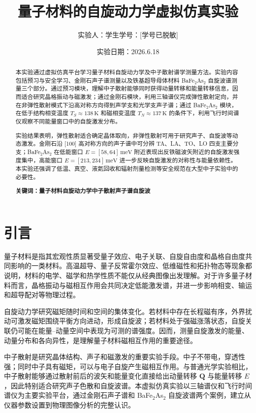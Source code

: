 \documentclass[a4paper]{ctexart}
\title{量子材料的自旋动力学虚拟仿真实验}
\author{实验人：学生\qquad 学号：[学号已脱敏]}
\date{实验日期：2026.6.18}
\begin{document}
\maketitle

\begin{abstract}
本实验通过虚拟仿真平台学习量子材料自旋动力学及中子散射谱学测量方法。实验内容包括预习与安全学习、金刚石声子谱测量以及铁基超导母体材料 BaFe$_2$As$_2$ 自旋波谱测量三个部分。通过预习模块，理解中子散射能够同时获得动量转移和能量转移信息，因而适合研究晶格振动与磁激发；通过金刚石模块，利用三轴谱仪完成弹性散射定向，并在非弹性散射模式下沿高对称方向得到声学支和光学支声子谱；通过 BaFe$_2$As$_2$ 模块，在低于结构相变温度 $T_S\approx138\,\mathrm{K}$ 和磁相变温度 $T_N\approx137\,\mathrm{K}$ 的条件下，利用飞行时间谱仪观察不同能量窗口中的自旋激发分布。

实验结果表明，弹性散射适合确定晶体取向，非弹性散射可用于研究声子、自旋波等动态激发。金刚石沿 [100] 高对称方向的声子谱中可分辨 TA、LA、TO、LO 四支主要分支；BaFe$_2$As$_2$ 在低能窗口 $E=[58,64]\,\mathrm{meV}$ 附近表现出反铁磁波矢附近的自旋激发强度集中，高能窗口 $E=[213,234]\,\mathrm{meV}$ 进一步反映自旋激发的对称性与能量依赖性。本实验还强调了低温、真空、液氦回收和辐射剂量检测等安全规范在大型中子实验中的必要性。

\textbf{关键词：量子材料\quad 自旋动力学\quad 中子散射\quad 声子谱\quad 自旋波}
\end{abstract}

\section{引言}

量子材料是指其宏观性质显著受量子效应、电子关联、自旋自由度和晶格自由度共同影响的一类材料。高温超导、量子反常霍尔效应、低维磁性和拓扑物态等现象都说明，材料的电学、磁学和热学性质不能仅从经典图像出发理解。对于许多量子材料而言，晶格振动与磁相互作用会共同决定低能激发谱，并进一步影响相变、输运和超导配对等物理过程。

自旋动力学研究磁矩随时间和空间的集体变化。若材料中存在长程磁有序，外界扰动可激发磁矩围绕平衡方向进动，形成自旋波；若材料处于强磁涨落状态，自旋关联仍可能在能量--动量空间中表现为可测的谱强度。因而，测量自旋激发的能量、动量分布和各向异性，是理解量子材料磁相互作用的重要途径。

中子散射是研究晶体结构、声子和磁激发的重要实验手段。中子不带电，穿透性强；同时中子具有磁矩，可以与电子自旋产生磁相互作用。与普通光学实验相比，中子散射能够通过散射前后的波矢和能量变化直接给出动量转移 $\mathbf{Q}$ 与能量转移 $E$，因此特别适合研究声子色散和自旋波谱。本虚拟仿真实验以三轴谱仪和飞行时间谱仪为主要实验平台，通过金刚石声子谱和 BaFe$_2$As$_2$ 自旋波谱两个案例，建立从仪器参数设置到物理图像分析的完整认识。
\end{document}
